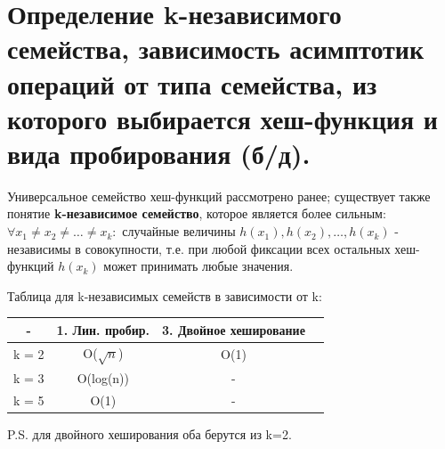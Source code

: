 \section{Определение k-независимого семейства, зависимость асимптотик операций от типа семейства, из которого выбирается хеш-функция и вида пробирования (б/д).}
Универсальное семейство хеш-функций рассмотрено ранее; существует также понятие \textbf{k-независимое семейство}, которое является более сильным: $\forall x_1 \neq x_2 \neq \dots \neq x_k: $ случайные величины $h(x_1), h(x_2), \dots, h(x_k)$ - независимы в совокупности, т.е. при любой фиксации всех остальных хеш-функций $h(x_k)$ может принимать любые значения. \par
Таблица для k-независимых семейств в зависимости от k: \par
\begin{center}
\begin{tabular}{ |c|c|c|c| } 
 \hline
 - & 1. Лин. пробир. & 3. Двойное хеширование \\ 
 \hline
  k = 2 &  {O}($\sqrt{n}$) & O(1) \\ 
 \hline
  k = 3 &  {O}(log(n)) & - \\ 
 \hline
  k = 5 &  {O}(1) & - \\ 
 \hline
\end{tabular}
\end{center} \par
P.S. для двойного хеширования оба берутся из k=2.

\setcounter{section}{82}
